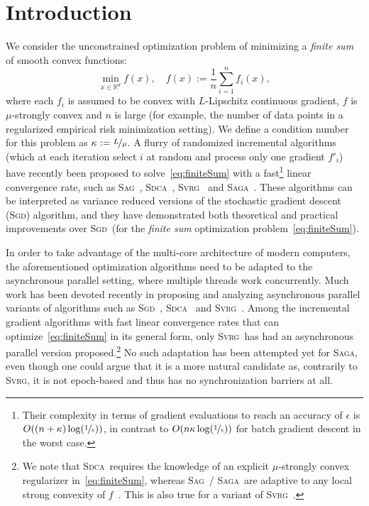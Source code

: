 \documentclass[twoside]{article}
\newcommand{\lipschitz}{L}
\newcommand{\SAGA}{\textsc{Saga}}
\newcommand{\SAG}{\textsc{Sag}}
\newcommand{\SVRG}{\textsc{Svrg}}
\newcommand{\SDCA}{\textsc{Sdca}}
\newcommand{\SGD}{\textsc{Sgd}}
\begin{document}
\section{Introduction}
We consider the unconstrained optimization problem of minimizing a \emph{finite sum} of smooth convex functions:
\vspace{-1mm}
\begin{equation} \label{eq:finiteSum}
\min_{x \in \mathbb{R}^d} f(x), \quad f(x) := \frac{1}{n} \sum_{i=1}^{n} f_i(x),
\end{equation}
where each $f_i$ is assumed to be convex with $\lipschitz$-Lipschitz continuous gradient, $f$ is $\mu$-strongly convex and $n$ is large (for example, the number of data points in a regularized empirical risk minimization setting).
We define a condition number for this problem as $\kappa := \nicefrac{\lipschitz}{\mu}$.
A flurry of randomized incremental algorithms (which at each iteration select $i$ at random and process only one gradient $f'_i$) have recently been proposed to solve~\eqref{eq:finiteSum} with a fast\footnote{Their complexity in terms of gradient evaluations to reach an accuracy of $\epsilon$ is $O((n+\kappa)\log(\nicefrac{1}{\epsilon}))$, in contrast to $O(n\kappa\log(\nicefrac{1}{\epsilon}))$ for batch gradient descent in the worst case.} linear convergence rate, such as \SAG~\citep{SAG}, \SDCA~\citep{SDCA}, \SVRG~\citep{svrg} and \SAGA~\citep{SAGA}.
These algorithms can be interpreted as variance reduced versions of the stochastic gradient descent (\SGD) algorithm, and they have demonstrated both theoretical and practical improvements over \SGD\ (for the \emph{finite sum} optimization problem~\eqref{eq:finiteSum}).

In order to take advantage of the multi-core architecture of modern computers, the aforementioned optimization algorithms need to be adapted to the asynchronous parallel setting, where multiple threads work concurrently.
Much work has been devoted recently in proposing and analyzing asynchronous parallel variants of algorithms such as \SGD~\citep{hogwild}, \SDCA~\citep{asyncSDCA2015} and \SVRG~\citep{smola,mania,asySVRG}.
Among the incremental gradient algorithms with fast linear convergence rates that can optimize~\eqref{eq:finiteSum} in its general form, only \SVRG\ has had an asynchronous parallel version proposed.\footnote{We note that \SDCA\ requires the knowledge of an explicit $\mu$-strongly convex regularizer in~\eqref{eq:finiteSum}, whereas \SAG~/ \SAGA\ are adaptive to any local strong convexity of $f$~\citep{laggedsaga,SAGA}. This is also true for a variant of \SVRG~\citep{qsaga}.}
No such adaptation has been attempted yet for \SAGA, even though one could argue that it is a more natural candidate as, contrarily to \SVRG, it is not epoch-based and thus has no synchronization barriers at all.
\end{document}
